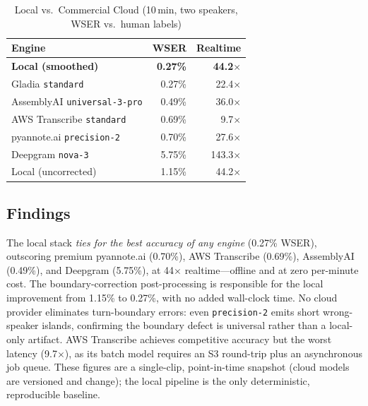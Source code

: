 \documentclass[conference,10pt]{IEEEtran}
\begin{document}
\begin{table}[!t]
\centering
\caption{Local vs.\ Commercial Cloud (10\,min, two speakers, WSER vs.\ human labels)}
\label{tab:cloudcompare}
\begin{tabular}{@{}lrr@{}}
\toprule
\textbf{Engine} & \textbf{WSER} & \textbf{Realtime} \\
\midrule
\textbf{Local (smoothed)}        & \textbf{0.27\%} & \textbf{44.2$\times$} \\
Gladia \texttt{standard}         & 0.27\%          & 22.4$\times$ \\
AssemblyAI \texttt{universal-3-pro} & 0.49\%       & 36.0$\times$ \\
AWS Transcribe \texttt{standard} & 0.69\%          & 9.7$\times$ \\
pyannote.ai \texttt{precision-2} & 0.70\%          & 27.6$\times$ \\
Deepgram \texttt{nova-3}         & 5.75\%          & 143.3$\times$ \\
\midrule
Local (uncorrected)             & 1.15\%          & 44.2$\times$ \\
\bottomrule
\end{tabular}
\end{table}

\subsection{Findings}

The local stack \emph{ties for the best accuracy of any engine} (0.27\% WSER),
outscoring premium pyannote.ai (0.70\%), AWS Transcribe (0.69\%), AssemblyAI
(0.49\%), and Deepgram (5.75\%), at 44$\times$ realtime---offline and at zero
per-minute cost. The boundary-correction post-processing is
responsible for the local improvement from 1.15\% to 0.27\%, with no added
wall-clock time. No cloud provider eliminates turn-boundary errors: even
\texttt{precision-2} emits short wrong-speaker islands, confirming the boundary
defect is universal rather than a local-only artifact. AWS Transcribe achieves
competitive accuracy but the worst latency (9.7$\times$), as its batch model
requires an S3 round-trip plus an asynchronous job queue. These figures are a
single-clip, point-in-time snapshot (cloud models are versioned and change); the
local pipeline is the only deterministic, reproducible baseline.

\end{document}
